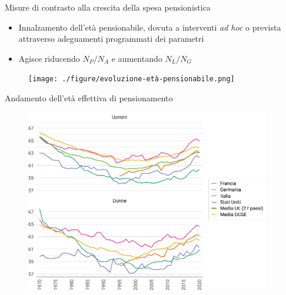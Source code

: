 \documentclass[aspectratio=64,12pt]{beamer}
\begin{document}
\begin{frame}{Misure di contrasto alla crescita della spesa pensionistica}
\begin{itemize}
\item Innalzamento dell'età pensionabile, dovuta a interventi \emph{ad hoc} o prevista
attraverso adeguamenti programmati dei parametri
\item Agisce riducendo $N_P/N_A$ e aumentando $N_L/N_G$
\end{itemize}

\begin{figure}[htbp]
\centering
\texttt{[image: ./figure/evoluzione-età-pensionabile.png]}
\end{figure}
\end{frame}


\begin{frame}{Andamento dell'età effettiva di pensionamento}
\begin{figure}[htbp]
\centering
\includegraphics[height=8cm]{./figure/eta-effettiva-pensionamento-color.pdf}
\end{figure}
\end{frame}
\end{document}
